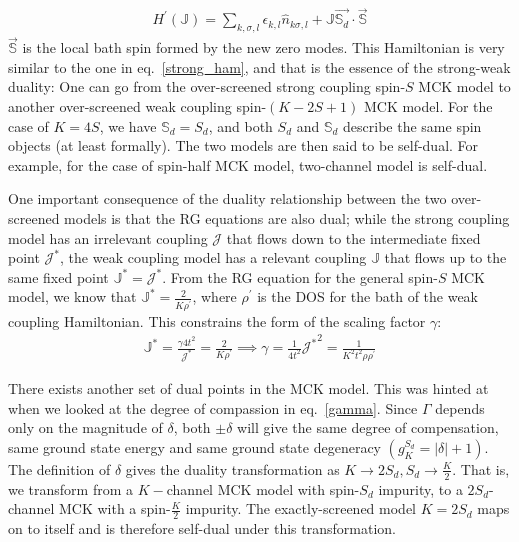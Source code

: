 \documentclass[reprint,prb,superscriptaddress]{revtex4-2}
\begin{document}
\begin{equation}\begin{aligned}
	H^\prime(\mathbb{J}) = \sum_{k,\sigma,l}\epsilon_{k,l} \hat n_{k\sigma,l} + \mathbb{J} \vec{\mathbb{S}_d}\cdot\vec{\mathbb{S}}
\end{aligned}\end{equation}
$\vec{\mathbb{S}}$ is the local bath spin formed by the new zero modes. This Hamiltonian is very similar to the one in eq.~\ref{strong_ham}, and that is the essence of the strong-weak duality: One can go from the over-screened strong coupling spin-\(S\) MCK model to another over-screened weak coupling spin-\((K-2S+1)\) MCK model. For the case of \(K=4S\), we have \(\mathbb{S}_d = S_d\), and both \(S_d\) and \(\mathbb{S}_d\) describe the same spin objects (at least formally). The two models are then said to be self-dual. For example, for the case of spin-half MCK model, two-channel model is self-dual.

One important consequence of the duality relationship between the two over-screened models is that the RG equations are also dual; while the strong coupling model has an irrelevant coupling \(\mathcal{J}\) that flows down to the intermediate fixed point \({\mathcal{J}^*}\), the weak coupling model has a relevant coupling \(\mathbb{J}\) that flows up to the same fixed point \({\mathbb{J}}^* = {\mathcal{J}^*}\). From the RG equation for the general spin-\(S\) MCK model, we know that \({\mathbb{J}}^* = \frac{2}{K \rho^\prime}\), where \(\rho^\prime\) is the DOS for the bath of the weak coupling Hamiltonian. This constrains the form of the scaling factor \(\gamma\):
\begin{equation}\begin{aligned}
	{\mathbb{J}}^* = \frac{\gamma 4t^2}{{\mathcal{J}^*}} = \frac{2}{K \rho^\prime} \implies \gamma = \frac{1}{4t^2} {{\mathcal{J}^*}}^2 = \frac{1}{K^2 t^2 \rho \rho^\prime}
\end{aligned}\end{equation}

There exists another set of dual points in the MCK model. This was hinted at when we looked at the degree of compassion in eq.~\ref{gamma}. Since \(\Gamma\) depends only on the magnitude of \(\delta\), both \(\pm \delta\) will give the same degree of compensation, same ground state energy and same ground state degeneracy \(\left(g^{S_d}_K = |\delta|+1\right)\). The definition of \(\delta\) gives the duality transformation as \(K \to 2S_d, S_d \to \frac{K}{2}\). That is, we transform from a \(K-\)channel MCK model with spin-\(S_d\) impurity, to a \(2S_d\)-channel MCK with a spin-\(\frac{K}{2}\) impurity. The exactly-screened model \(K=2S_d\) maps on to itself and is therefore self-dual under this transformation.
\end{document}

